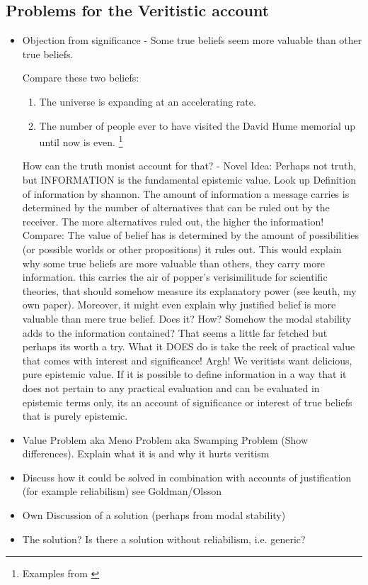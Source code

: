 \documentclass[12pt,numbers=noenddot]{scrartcl}
\begin{document}
\subsection{Problems for the Veritistic account}
\begin{itemize}
    \item Objection from significance - Some true beliefs seem more valuable than other true beliefs.

    Compare these two beliefs:
    \begin{enumerate}
        \item The universe is expanding at an accelerating rate.
        \item The number of people ever to have visited the David Hume memorial up until now is even. \footnote{Examples from \textcite{Ahlstrom-Vij2013}}
    \end{enumerate}


    How can the truth monist account for that? - Novel Idea: Perhaps not truth, but INFORMATION is the fundamental epistemic value. Look up Definition of information by shannon. The amount of information a message carries is determined by the number of alternatives that can be ruled out by the receiver. The more alternatives ruled out, the higher the information! Compare: The value of belief has is determined by the amount of possibilities (or possible worlds or other propositions) it rules out. This would explain why some true beliefs are more valuable than others, they carry more information. this carries the air of popper's verisimilitude for scientific theories, that should somehow measure its explanatory power (see keuth, my own paper).
    Moreover, it might even explain why justified belief is more valuable than mere true belief. Does it? How? Somehow the modal stability adds to the information contained? That seems a little far fetched but perhaps its worth a try. 
    What it DOES do is take the reek of practical value that comes with interest and significance! Argh! We veritists want delicious, pure epistemic value. If it is possible to define information in a way that it does not pertain to any practical evaluation and can be evaluated in epistemic terms only, its an account of significance or interest of true beliefs that is purely epistemic.

    \item Value Problem aka Meno Problem aka Swamping Problem (Show differences). Explain what it is and why it hurts veritism 
    \item Discuss how it could be solved in combination with accounts of justification (for example reliabilism) see Goldman/Olsson
    \item Own Discussion of a solution (perhaps from modal stability)
    \item The solution? Is there a solution without reliabilism, i.e. generic?
\end{itemize}
\end{document}

